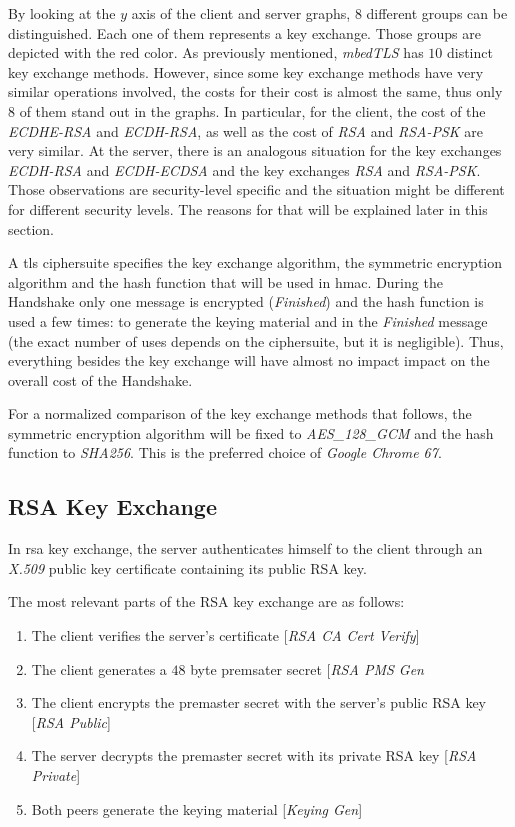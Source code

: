 \documentclass{llncs}
\begin{document}
By looking at the $y$ axis of the client and server graphs, $8$ different groups can be distinguished. Each one of them 
represents a key exchange. Those groups are depicted with the red color.  As previously mentioned, \textit{mbedTLS} has 
$10$ distinct key exchange methods. However, since some key exchange methods have very similar operations involved,
the costs for their cost is almost the same, thus only $8$ of them stand out in the graphs. In particular,
for the client, the cost of the \textit{ECDHE-RSA} and \textit{ECDH-RSA}, as well as the cost of \textit{RSA} and \textit{RSA-PSK}
are very similar. At the server, there is an analogous situation for the key exchanges \textit{ECDH-RSA} and \textit{ECDH-ECDSA}
and the key exchanges \textit{RSA} and \textit{RSA-PSK}. Those observations are security-level specific and the situation
might be different for different security levels. The reasons for that will be explained later in this section.

A \gls{tls} ciphersuite specifies the key exchange algorithm, the symmetric encryption algorithm and the hash function
that will be used in \gls{hmac}. During the Handshake only one message is encrypted (\textit{Finished}) and the hash function
is used a few times: to generate the keying material and in the \textit{Finished} message (the exact number of uses
depends on the ciphersuite, but it is negligible). Thus, everything besides the key exchange will have almost no impact
impact on the overall cost of the Handshake.

For a normalized comparison of the key exchange methods that follows, the symmetric encryption algorithm
will be fixed to \textit{AES\_128\_GCM} and the hash function to \textit{SHA256}. This is the preferred choice
of \textit{Google Chrome 67}.


\subsection{RSA Key Exchange}

In \gls{rsa} key exchange, the server authenticates himself to the client through
an \textit{X.509} public key certificate containing its public RSA key.

The most relevant parts of the RSA key exchange are as follows:

\begin{enumerate}
  \item The client verifies the server's certificate [\textit{RSA CA Cert Verify}]
\item The client generates a $48$ byte premsater secret [\textit{RSA PMS Gen}
  \item The client encrypts the premaster secret with the server's public RSA key [\textit{RSA Public}]
  \item The server decrypts the premaster secret with its private RSA key [\textit{RSA Private}]
  \item Both peers generate the keying material [\textit{Keying Gen}]
\end{enumerate}
\end{document}
